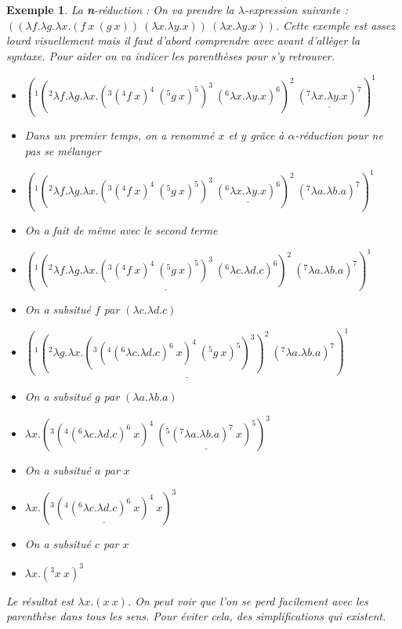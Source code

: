 \documentclass[10pt,a4paper]{report}
\newtheorem{ex}{Exemple}
\begin{document}
\begin{ex}
	La \textbf{n}-réduction : On va prendre la $\lambda$-expression suivante : $((\lambda f.\lambda g.\lambda x.(f~x~(g~x))~(\lambda x.\lambda y.x))~(\lambda x.\lambda y.x))$. Cette exemple est assez lourd visuellement mais il faut d'abord comprendre avec avant d'allèger la syntaxe. Pour aider on va indicer les parenthèses pour s'y retrouver. 
	\smallbreak
	
	\begin{itemize}
		\item[] $(^{1}(^{2}\lambda f.\lambda g.\lambda x.(^{3}(^{4}f~x)^{4}~(^{5}g~x)^{5})^{3}~(^{6}\lambda x.\lambda y.x)^{6})^{2}~\underline{(^{7}\lambda x.\lambda y.x)^{7}})^{1}$
		\item[] Dans un premier temps, on a renommé $x$ et $y$ grâce à $\alpha$-réduction pour ne pas se mélanger
		\item[$\rightarrow^{\alpha}_{\textbf{n}}$] $(^{1}(^{2}\lambda f.\lambda g.\lambda x.(^{3}(^{4}f~x)^{4}~(^{5}g~x)^{5})^{3}~\underline{(^{6}\lambda x.\lambda y.x)^{6}})^{2}~(^{7}\lambda a.\lambda b.a)^{7})^{1}$
		
		\item[] On a fait de même avec le second terme
		\item[$\rightarrow^{\alpha}_{\textbf{n}}$] $(^{1}\underline{(^{2}\lambda f.\lambda g.\lambda x.(^{3}(^{4}f~x)^{4}~(^{5}g~x)^{5})^{3}~(^{6}\lambda c.\lambda d.c)^{6})^{2}}~(^{7}\lambda a.\lambda b.a)^{7})^{1}$
		
		\item[] On a subsitué $f$ par $(\lambda c.\lambda d.c)$
		\item[$\rightarrow^{\beta}_{\textbf{n}}$] $\underline{(^{1}(^{2}\lambda g.\lambda x.(^{3}(^{4}(^{6}\lambda c.\lambda d.c)^{6}~x)^{4}~(^{5}g~x)^{5})^{3})^{2}~(^{7}\lambda a.\lambda b.a)^{7})^{1}}$
		
		\item[] On a subsitué $g$ par $(\lambda a.\lambda b.a)$
		\item[$\rightarrow^{\beta}_{\textbf{n}}$] $\lambda x.(^{3}(^{4}(^{6}\lambda c.\lambda d.c)^{6}~x)^{4}~\underline{(^{5}(^{7}\lambda a.\lambda b.a)^{7}~x)^{5}})^{3}$
		
		\item[] On a subsitué $a$ par $x$
		\item[$\rightarrow^{\beta}_{\textbf{n}}$] $\lambda x.(^{3}\underline{(^{4}(^{6}\lambda c.\lambda d.c)^{6}~x)^{4}}~x)^{3}$
		
		\item[] On a subsitué $c$ par $x$
		\item[$\rightarrow^{\beta}_{\textbf{n}}$] $\lambda x.(^{3}x~x)^{3}$
	\end{itemize}
	\bigbreak
	
	Le résultat est $\lambda x.(x~x)$. On peut voir que l'on se perd facilement avec les parenthèse dans tous les sens. Pour éviter cela, des simplifications qui existent.
\end{ex}
\end{document}
